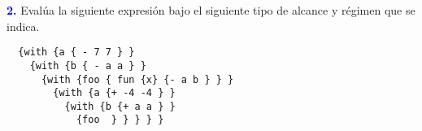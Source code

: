 \textbf{\textcolor{blue}{2.}} Evalúa la siguiente expresión
bajo el siguiente tipo de alcance y régimen que se indica. \newline

\begin{lstlisting}
  {with {a { - 7 7 } }
    {with {b { - a a } }
      {with {foo { fun {x} {- a b } } }
        {with {a {+ -4 -4 } }
          {with {b {+ a a } }
            {foo  } } } } }
\end{lstlisting}

